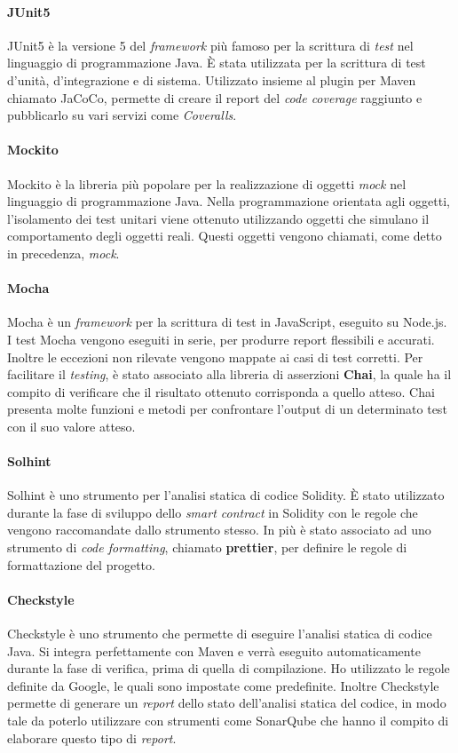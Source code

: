\paragraph{JUnit5}

JUnit5 è la versione 5 del \textit{framework} più famoso per la scrittura di \textit{test} nel linguaggio di programmazione Java. È stata utilizzata per la scrittura di test d'unità, d'integrazione e di sistema. Utilizzato insieme al plugin per Maven chiamato JaCoCo, permette di creare il report del \textit{code coverage} raggiunto e pubblicarlo su vari servizi come \textit{Coveralls}.

\paragraph{Mockito}
Mockito è la libreria più popolare per la realizzazione di oggetti \textit{mock} nel linguaggio di programmazione Java. Nella programmazione orientata agli oggetti, l'isolamento dei test unitari viene ottenuto utilizzando oggetti che simulano il comportamento degli oggetti reali. Questi oggetti vengono chiamati, come detto in precedenza, \textit{mock}.

\paragraph{Mocha}
Mocha è un \textit{framework} per la scrittura di test in JavaScript, eseguito su Node.js. I test Mocha vengono eseguiti in serie, per produrre report flessibili e accurati. Inoltre le eccezioni non rilevate vengono mappate ai casi di test corretti. Per facilitare il \textit{testing}, è stato associato alla libreria di asserzioni \textbf{Chai}, la quale ha il compito di verificare che il risultato ottenuto corrisponda a quello atteso. Chai presenta molte funzioni e metodi per confrontare l'output di un determinato test con il suo valore atteso.

\paragraph{Solhint}
Solhint è uno strumento per l'analisi statica di codice Solidity. È stato utilizzato durante la fase di sviluppo dello \textit{smart contract} in Solidity con le regole che vengono raccomandate dallo strumento stesso. In più è stato associato ad uno strumento di \textit{code formatting}, chiamato \textbf{prettier}, per definire le regole di formattazione del progetto.


\paragraph{Checkstyle}
Checkstyle è uno strumento che permette di eseguire l'analisi statica di codice Java. Si integra perfettamente con Maven e verrà eseguito automaticamente durante la fase di verifica, prima di quella di compilazione. Ho utilizzato le regole definite da Google, le quali sono impostate come predefinite.
Inoltre Checkstyle permette di generare un \textit{report} dello stato dell'analisi statica del codice, in modo tale da poterlo utilizzare con strumenti come SonarQube che hanno il compito di elaborare questo tipo di \textit{report}.
